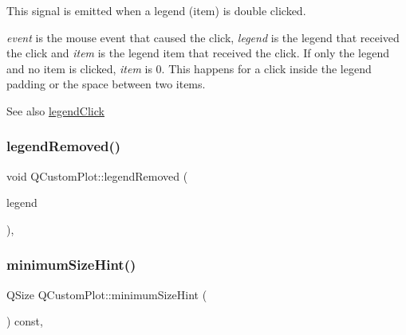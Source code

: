 This signal is emitted when a legend (item) is double clicked.

{\itshape event} is the mouse event that caused the click, {\itshape legend} is the legend that received the click and {\itshape item} is the legend item that received the click. If only the legend and no item is clicked, {\itshape item} is 0. This happens for a click inside the legend padding or the space between two items.

\begin{DoxySeeAlso}{See also}
\mbox{\hyperlink{class_q_custom_plot_a79cff0baafbca10a3aaf694d2d3b9ab3}{legend\+Click}} 
\end{DoxySeeAlso}
\mbox{\label{class_q_custom_plot_a9d173454555021c9ffd4f675c4d9037a}} 
\subsubsection{\texorpdfstring{legendRemoved()}{legendRemoved()}}
{\footnotesize\ttfamily void Q\+Custom\+Plot\+::legend\+Removed (\begin{DoxyParamCaption}\item[{\mbox{\hyperlink{class_q_c_p_legend}{Q\+C\+P\+Legend}} $\ast$}]{legend }\end{DoxyParamCaption})\hspace{0.3cm}{\ttfamily [protected]}, {\ttfamily [virtual]}}

\mbox{\label{class_q_custom_plot_a968a01cd4077d63aecde1aef1db057fc}} 
\subsubsection{\texorpdfstring{minimumSizeHint()}{minimumSizeHint()}}
{\footnotesize\ttfamily Q\+Size Q\+Custom\+Plot\+::minimum\+Size\+Hint (\begin{DoxyParamCaption}{ }\end{DoxyParamCaption}) const\hspace{0.3cm}{\ttfamily [protected]}, {\ttfamily [virtual]}}

\mbox{\label{class_q_custom_plot_a9b232142c64fcf273a953ee08e5b90e9}} 
